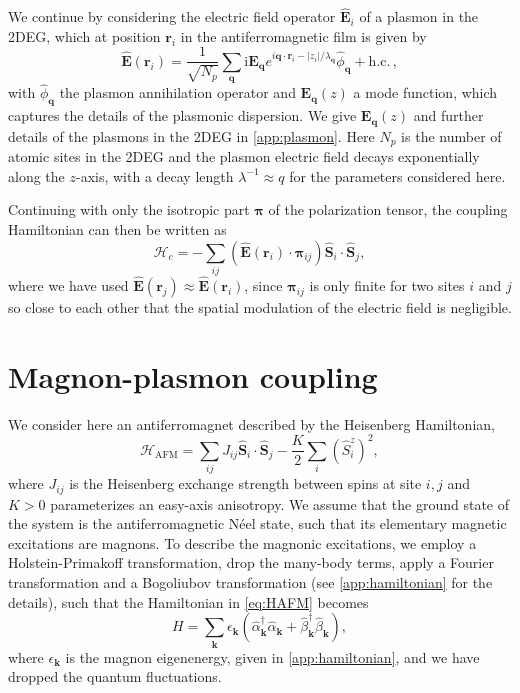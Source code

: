 \documentclass[aps,prb,reprint,twocolumns,superscriptaddress,nofootinbib]{revtex4-2}
\newcommand{\hc}{\text{h.c.}}
\newcommand{\ii}{\mathrm{i}}
\begin{document}
	We continue by considering the electric field operator $\hat{\bm E}_i$ of a plasmon in the 2DEG, which at position $\bm r_i$ in the antiferromagnetic film is given by \cite{ferreiraQuantizationGraphenePlasmons2020}
	\begin{equation}
		\hat{\bm E}(\bm r_i)= \frac{1}{\sqrt{N_p}}\sum_{\bm q} \ii \bm E_{\bm q}e^{i\bm q \cdot \bm r_i- |z_i|/\lambda_{\bm q}} \hat\phi_{\bm q} + \hc\, ,
	\end{equation}
	with $\hat\phi_{\bm q}$ the plasmon annihilation operator and $\bm E_{\bm q}(z)$ a mode function, which captures the details of the plasmonic dispersion. We give $\bm E_{\bm q}(z)$ and further details of the plasmons in the 2DEG in \cref{app:plasmon}. Here $N_p$ is the number of atomic sites in the 2DEG and the plasmon electric field decays exponentially along the $z$-axis, with a decay length $\lambda^{-1}\approx q$ for the parameters considered here. 
	
	
	
	Continuing with only the isotropic part $\bm \pi$ of the polarization tensor, the coupling Hamiltonian can then be written as
	\begin{equation}
		\mathcal H_c = -\sum_{ij} (\hat{\bm E}(\bm r_i) \cdot \bm\pi_{ij}) \hat{\bm S}_i \cdot \hat{\bm S}_j, \label{eq:Hc-pi}
	\end{equation}
	where we have used $\hat{\bm E}(\bm r_j) \approx \hat{\bm E}(\bm r_i)$, since $\bm\pi_{ij}$ is only finite for two sites $i$ and $j$ so close to each other that the spatial modulation of the electric field is negligible.
	
	
	
	
	
	
	\section{Magnon-plasmon coupling}
	\label{sec:method}
	We consider here an antiferromagnet described by the Heisenberg Hamiltonian,
	\begin{equation}
		\mathcal H_{\mathrm{AFM}} = \sum_{ij}J_{ij}\hat{ \bm S}_i \cdot \hat{ \bm S}_j - \frac{K}{2}\sum_i (\hat S^z_i)^2, \label{eq:HAFM}
	\end{equation}
	where $J_{ij}$ is the Heisenberg exchange strength between spins at site $i,j$ and $K>0$ parameterizes an easy-axis anisotropy. We assume that the ground state of the system is the antiferromagnetic Néel state, such that its elementary magnetic excitations are magnons. To describe the magnonic excitations, we employ a Holstein-Primakoff transformation, drop the many-body terms, apply a Fourier transformation and
	a Bogoliubov transformation (see \cref{app:hamiltonian} for the details), such that the Hamiltonian in \cref{eq:HAFM} becomes 
	\begin{equation}
		H=\sum_{\bm k} \epsilon_{\bm k} \left(  \hat \alpha_{\bm k}^\dagger \hat \alpha_{\bm k} + \hat\beta_{\bm k}^\dagger \hat\beta_{\bm k} \right),
	\end{equation}
	where $\epsilon_{\bm k}$ is the magnon eigenenergy, given in \cref{app:hamiltonian}, and we have dropped the quantum fluctuations.
	
\end{document}
